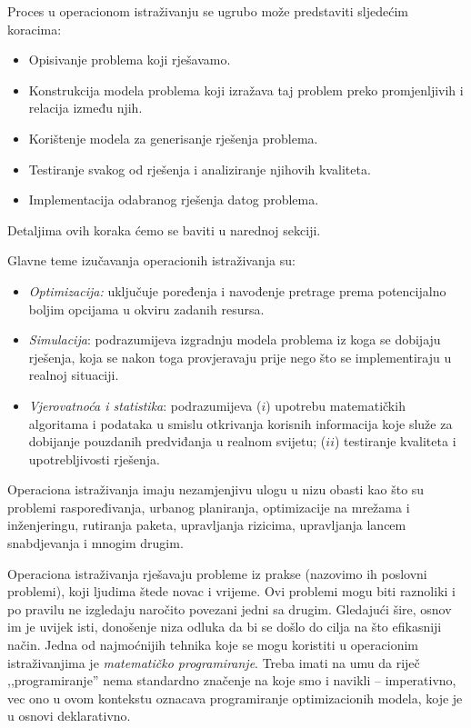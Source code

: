 \documentclass[b5paper, utf8, 11pt, colorlinks]{book}
\theoremstyle{definition}
\begin{document}
Proces u operacionom istraživanju se ugrubo može predstaviti sljedećim koracima:
\begin{itemize}
    \item Opisivanje problema koji rješavamo.
    \item Konstrukcija modela problema koji izražava taj problem preko promjenljivih i relacija između njih. 
    \item Korištenje modela za generisanje rješenja problema.
    \item Testiranje svakog od rješenja i analiziranje njihovih  kvaliteta.
    \item Implementacija odabranog rješenja datog problema. 
\end{itemize}

Detaljima ovih koraka ćemo se baviti  u narednoj sekciji.
 

Glavne teme izučavanja operacionih istraživanja su:
\begin{itemize}
     \item \emph{Optimizacija:} %
       uključuje poređenja i navođenje pretrage prema potencijalno boljim opcijama u okviru zadanih resursa.
     \item \emph{Simulacija}:  podrazumijeva izgradnju modela problema iz koga se dobijaju rješenja, koja se nakon toga provjeravaju prije nego što se implementiraju u realnoj situaciji.
     \item \emph{Vjerovatnoća i statistika}:  podrazumijeva ($i$) upotrebu matematičkih algoritama i podataka u smislu otkrivanja korisnih informacija koje služe za dobijanje pouzdanih predviđanja u realnom svijetu; ($ii$) testiranje kvaliteta i upotrebljivosti rješenja.
\end{itemize}
 
 Operaciona istraživanja imaju nezamjenjivu ulogu u nizu obasti kao što su problemi raspoređivanja, urbanog planiranja, optimizacije na mrežama i inženjeringu, rutiranja paketa, upravljanja rizicima, upravljanja lancem snabdjevanja i mnogim drugim. 

 Operaciona istraživanja rješavaju probleme iz prakse (nazovimo ih poslovni problemi), koji ljudima štede novac i vrijeme. Ovi problemi mogu biti raznoliki i po pravilu ne izgledaju naročito povezani jedni sa drugim. Gledajući šire, osnov  im je uvijek isti, donošenje niza odluka da bi se došlo do cilja na što efikasniji način.
Jedna od najmoćnijih tehnika koje se mogu koristiti u operacionim istraživanjima je \emph{matematičko programiranje}. Treba imati na umu da riječ  ,,programiranje'' nema standardno značenje na koje smo i navikli -- imperativno, vec ono u ovom kontekstu oznacava programiranje optimizacionih modela, koje je u osnovi deklarativno. 
\end{document}
